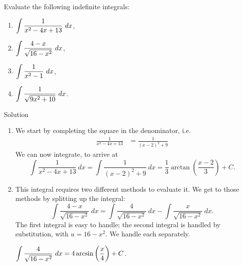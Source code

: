 \ifanalysis\pagebreak\fi
\begin{example}
Evaluate the following indefinite integrals:
\begin{multicols}{2}
\begin{enumerate}
\item $\ds \int\frac{1}{x^2-4x+13}\ dx$,
\item $\ds \int \frac{4-x}{\sqrt{16-x^2}}\ dx$,
\ifanalysis \item $\ds \int\frac{1}{x^2-1}\ dx$,
\item $\ds \int \frac{1}{\sqrt{9x^2+10}}\ dx$. \fi
\end{enumerate}
\end{multicols}

\ifcalculus\pagebreak\fi
{}Solution 

\begin{enumerate}
\item We start by completing the square in the denominator, i.e. 
\begin{align*}
\frac{1}{x^2-4x+13} &=\frac{1}{(x-2)^2 + 9}
\end{align*}
We can now integrate, to arrive at 
$$ \int \frac{1}{x^2-4x+13}\ dx = \int \frac{1}{(x-2)^2+9}\ dx = \frac13\arctan\left(\frac{x-2}{3}\right)+C.$$
\item This integral requires two different methods to evaluate it. We get to those methods by splitting up the integral: 
$$ \int \frac{4-x}{\sqrt{16-x^2}}\ dx = \int \frac{4}{\sqrt{16-x^2}}\ dx - \int \frac{x}{\sqrt{16-x^2}}\ dx.$$
The first integral is easy to handle; the second integral is handled by substitution, with $u = 16-x^2$. We handle each separately.

$\displaystyle \int \frac{4}{\sqrt{16-x^2}}\ dx = 4\arcsin\left(\frac{x}{4}\right) + C$.
\vskip 10pt


\end{enumerate}
\end{example}
